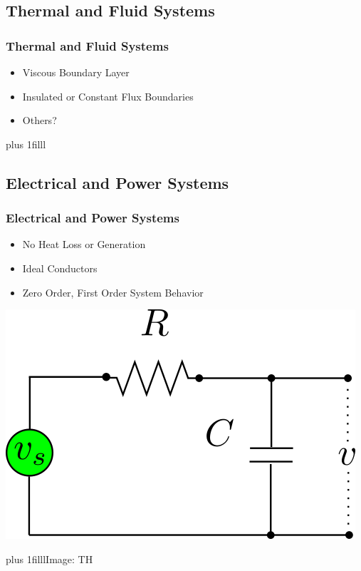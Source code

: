 \documentclass[fleqn]{beamer} %
\newcommand{\sectionIIIsubsectionIIItitle}{Thermal and Fluid Systems}
\newcommand{\sectionIIIsubsectionIVtitle}{Electrical and Power Systems}
\newcommand{\btVFill}{\vskip0pt plus 1filll}
\begin{document}
		\subsection{\sectionIIIsubsectionIIItitle}\label{sectionIIIsubsectionIII}

			\begin{frame}
				\frametitle{\sectionIIIsubsectionIIItitle}
				\bigskip
				
				\begin{itemize}
					\item Viscous Boundary Layer
					\item Insulated or Constant Flux Boundaries
					\item Others?
				\end{itemize}	

				\btVFill
			\end{frame}

		\subsection{\sectionIIIsubsectionIVtitle}\label{sectionIIIsubsectionIV}	

			\begin{frame}
				\frametitle{\sectionIIIsubsectionIVtitle}
				\begin{multicols}{2}
					\begin{itemize}
					\item No Heat Loss or Generation
					\item Ideal Conductors
					\item Zero Order, First Order System Behavior
					\end{itemize}

					\includegraphics[scale=.25]{images/rc_circuit.png}
				\end{multicols}
				
				\btVFill {\tiny Image: TH}
			\end{frame}
\end{document}
